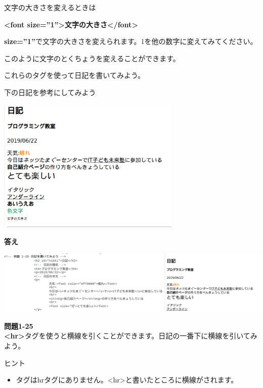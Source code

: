 文字の大きさを変えるときは

\textbf{{\textless}font size=”1”{\textgreater}文字の大きさ{\textless}/font{\textgreater}}

\textbf{size=”1”}で文字の大きさを変えられます。1を他の数字に変えてみてください。

このように文字のとくちょうを変えることができます。


\bigskip

これらのタグを使って日記を書いてみよう。

下の日記を参考にしてみよう


\bigskip

\includegraphics[width=8.779cm]{text01-img/textbook-img185.png}

\clearpage


\textbf{答え}



\includegraphics[width=\textwidth]{text01-img/textbook-img188.png}

\noindent \textbf{問題1-25}\\
\textbf{{\textless}hr{\textgreater}}タグを使うと横線を引くことができます。日記の一番下に横線を引いてみよう。

ヒント

\begin{itemize}
  \item
        タグはhrタグにありません。{\textless}hr{\textgreater}と書いたところに横線がされます。
\end{itemize}

